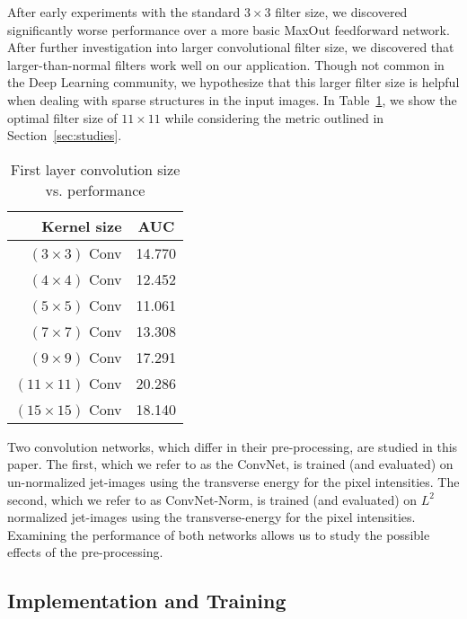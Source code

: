 After early experiments with the standard $3\times 3$ filter size, we discovered significantly worse performance over a more basic MaxOut \cite{maxout:goodfellow} feedforward network. After further investigation into larger convolutional filter size, we discovered that larger-than-normal filters work well on our application. Though not common in the Deep Learning community, we hypothesize that this larger filter size is helpful when dealing with sparse structures in the input images. In Table~\ref{tab:kernelsize}, we show the optimal filter size of $11\times11$ while considering the metric outlined in Section~\ref{sec:studies}.

\begin{table}[h!]
  \centering
  \begin{tabular}{r|c}
    \bfseries Kernel size & \bfseries AUC \\ 
    \hline
    $(3 \times 3)$ Conv & 14.770 \\
    \hline
    $(4 \times 4)$ Conv & 12.452 \\
    \hline
    $(5 \times 5)$ Conv & 11.061 \\
    \hline
    $(7 \times 7)$ Conv & 13.308 \\
    \hline
    $(9 \times 9)$ Conv & 17.291 \\
    \hline
    $(11 \times 11)$ Conv & 20.286 \\
    \hline
    $(15 \times 15)$ Conv & 18.140 \\
  \end{tabular}
  \caption{First layer convolution size vs. performance}
  \label{tab:kernelsize}
\end{table}

Two convolution networks, which differ in their pre-processing, are studied in this paper.  The first, which we refer to as the ConvNet, is trained (and evaluated) on un-normalized jet-images using the transverse energy for the pixel intensities.  The second, which we refer to as ConvNet-Norm, is trained (and evaluated) on $L^{2}$ normalized jet-images using the transverse-energy for the pixel intensities.  Examining the performance of both networks allows us to study the possible effects of the pre-processing.




\subsection{Implementation and Training} %
\label{ssub:implementation_and_training}

